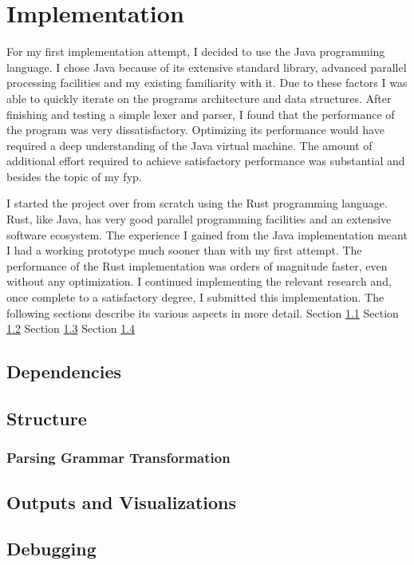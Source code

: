 \chapter{Implementation} \label{implementation}

For my first implementation attempt, I decided to use the Java programming
language. I chose Java because of its extensive standard library, advanced
parallel processing facilities and my existing familiarity with it. Due to
these factors I was able to quickly iterate on the programs architecture and
data structures. After finishing and testing a simple lexer and parser, I
found that the performance of the program was very dissatisfactory. Optimizing
its performance would have required a deep understanding of the Java virtual
machine. The amount of additional effort required to achieve satisfactory
performance was substantial and besides the topic of my \gls{fyp}.

I started the project over from scratch using the Rust programming language.
Rust, like Java, has very good parallel programming facilities and an extensive
software ecosystem. The experience I gained from the Java implementation meant I
had a working prototype much sooner than with my first attempt. The performance
of the Rust implementation was orders of magnitude faster, even without any
optimization. I continued implementing the relevant research and, once complete
to a satisfactory degree, I submitted this implementation. The following
sections describe its various aspects in more detail.
\newline \newline
Section \ref{dependancies}
\newline \newline
Section \ref{structure}
\newline \newline
Section \ref{outputs_and_visualizations}
\newline \newline
Section \ref{debugging}


\section{Dependencies} \label{dependancies}
\section{Structure} \label{structure}
\subsection{Parsing Grammar Transformation} \label{parsing_grammar_transformation}
\section{Outputs and Visualizations} \label{outputs_and_visualizations}
\section{Debugging} \label{debugging}
